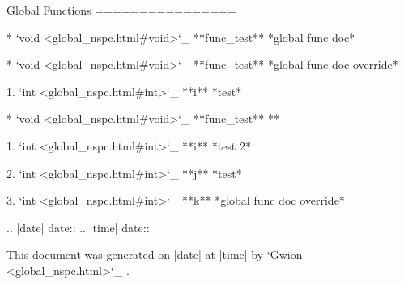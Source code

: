 Global Functions
================

	* `void <global_nspc.html#void>`_ **func_test**	*global func doc*

	* `void <global_nspc.html#void>`_ **func_test**	*global func doc override*

		1. `int <global_nspc.html#int>`_ **i** *test*

	* `void <global_nspc.html#void>`_ **func_test**	**

		1. `int <global_nspc.html#int>`_ **i** *test 2*

		2. `int <global_nspc.html#int>`_ **j** *test*

		3. `int <global_nspc.html#int>`_ **k** *global func doc override*




.. |date| date::
.. |time| date:: %

This document was generated on |date| at |time| by `Gwion <global_nspc.html>`_ .
